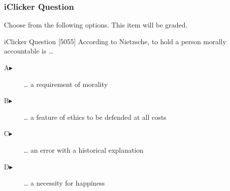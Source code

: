 \begin{frame}
  \frametitle{iClicker Question}
Choose from the following options. This item will be graded.
\begin{block}{iClicker Question}
[5055] According to Nietzsche, to hold a person morally accountable is {\ldots}
\end{block}
\begin{description}
\item[A\hspace{.2in}$\blacktriangleright$] {\ldots} a requirement of morality
\item[B\hspace{.2in}$\blacktriangleright$] {\ldots} a feature of ethics to be defended at all costs
\item[C\hspace{.2in}$\blacktriangleright$] {\ldots} an error with a historical explanation
\item[D\hspace{.2in}$\blacktriangleright$] {\ldots} a necessity for happiness
\end{description}
\end{frame}